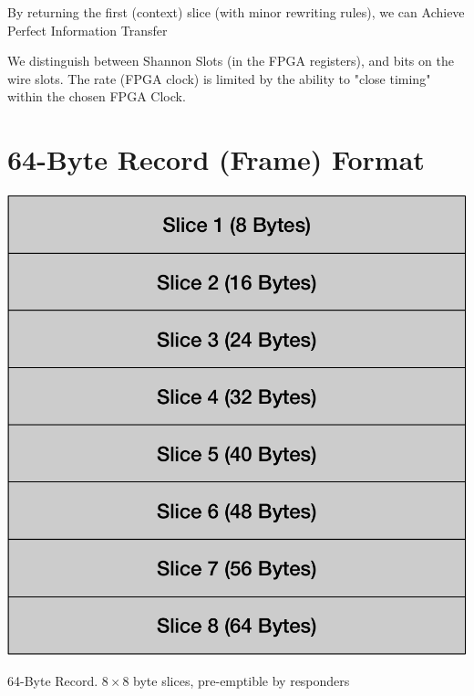\documentclass[../HFT-main.tex]{subfiles}
\begin{document}
By returning the first (context)  slice (with minor rewriting rules), we can Achieve Perfect Information Transfer

We distinguish between Shannon Slots (in the FPGA registers), and bits on the wire slots. The rate (FPGA clock)  is limited by the ability to "close timing" within the chosen FPGA Clock.






\newpage

\section{\huge 64-Byte Record (Frame) Format}
\begin{marginfigure}
  \includegraphics[width=\linewidth]{../figures/64-Byte-record.pdf}
  \caption{64-Byte Record. $8\times8$ byte slices, pre-emptible by responders} %
\end{marginfigure}
\end{document}
